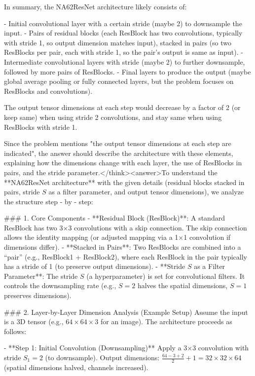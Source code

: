 In summary, the NA62ResNet architecture likely consists of:

- Initial convolutional layer with a certain stride (maybe 2) to downsample the input.
- Pairs of residual blocks (each ResBlock has two convolutions, typically with stride 1, so output dimension matches input), stacked in pairs (so two ResBlocks per pair, each with stride 1, so the pair's output is same as input).
- Intermediate convolutional layers with stride (maybe 2) to further downsample, followed by more pairs of ResBlocks.
- Final layers to produce the output (maybe global average pooling or fully connected layers, but the problem focuses on ResBlocks and convolutions).

The output tensor dimensions at each step would decrease by a factor of 2 (or keep same) when using stride 2 convolutions, and stay same when using ResBlocks with stride 1.

Since the problem mentions "the output tensor dimensions at each step are indicated", the answer should describe the architecture with these elements, explaining how the dimensions change with each layer, the use of ResBlocks in pairs, and the stride parameter.</think><answer>To understand the **NA62ResNet architecture** with the given details (residual blocks stacked in pairs, stride \( S \) as a filter parameter, and output tensor dimensions), we analyze the structure step - by - step:  


### 1. Core Components  
- **Residual Block (ResBlock)**: A standard ResBlock has two 3×3 convolutions with a skip connection. The skip connection allows the identity mapping (or adjusted mapping via a 1×1 convolution if dimensions differ).  
- **Stacked in Pairs**: Two ResBlocks are combined into a “pair” (e.g., ResBlock1 + ResBlock2), where each ResBlock in the pair typically has a stride of 1 (to preserve output dimensions).  
- **Stride \( S \) as a Filter Parameter**: The stride \( S \) (a hyperparameter) is set for convolutional filters. It controls the downsampling rate (e.g., \( S = 2 \) halves the spatial dimensions, \( S = 1 \) preserves dimensions).  


### 2. Layer-by-Layer Dimension Analysis (Example Setup)  
Assume the input is a 3D tensor (e.g., \( 64 \times 64 \times 3 \) for an image). The architecture proceeds as follows:  

- **Step 1: Initial Convolution (Downsampling)**  
  Apply a 3×3 convolution with stride \( S_1 = 2 \) (to downsample).  
  Output dimensions: \( \frac{64 - 3 + 2}{2} + 1 = 32 \times 32 \times 64 \) (spatial dimensions halved, channels increased).  

